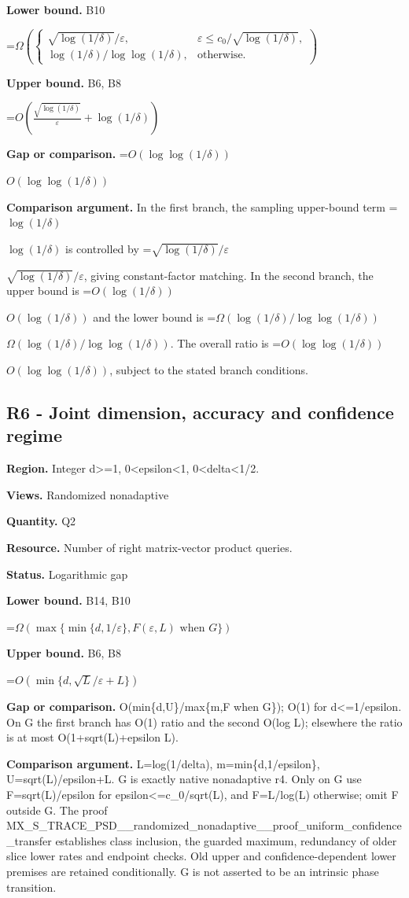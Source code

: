 \documentclass[10pt,a4paper]{article}
\newcommand{\AtlasMath}[1]{\par\begingroup\centering\setbox0=\hbox{$\displaystyle #1$}\ifdim\wd0>1.4\linewidth\typeout{ATLAS WIDE FORMULA: \the\wd0}\fi\ifdim\wd0>\linewidth\resizebox{\linewidth}{!}{\box0}\else\box0\fi\par\endgroup}
\newcommand{\AtlasInlineMath}[1]{\begingroup\setbox0=\hbox{$#1$}\ifdim\wd0>.4\linewidth\endgroup\AtlasMath{#1}\else\endgroup$#1$\fi}
\begin{document}
\textbf{Lower bound.} B10

\AtlasMath{\Omega\!\left(\begin{cases}\sqrt{\log(1/\delta)}/\varepsilon,&\varepsilon\le c_0/\sqrt{\log(1/\delta)},\\\log(1/\delta)/\log\log(1/\delta),&\text{otherwise}.\end{cases}\right)}
\textbf{Upper bound.} B6, B8

\AtlasMath{O\!\left(\frac{\sqrt{\log(1/\delta)}}{\varepsilon}+\log(1/\delta)\right)}
\textbf{Gap or comparison.} \AtlasInlineMath{O(\log\log(1/\delta))}

\textbf{Comparison argument.} In the first branch, the sampling upper-bound term \AtlasInlineMath{\log(1/\delta)} is controlled by \AtlasInlineMath{\sqrt{\log(1/\delta)}/\varepsilon}, giving constant-factor matching. In the second branch, the upper bound is \AtlasInlineMath{O(\log(1/\delta))} and the lower bound is \AtlasInlineMath{\Omega(\log(1/\delta)/\log\log(1/\delta))}. The overall ratio is \AtlasInlineMath{O(\log\log(1/\delta))}, subject to the stated branch conditions.

\subsection{R6 - Joint dimension, accuracy and confidence regime}
\textbf{Region.} Integer d>=1, 0<epsilon<1, 0<delta<1/2.

\textbf{Views.} Randomized nonadaptive

\textbf{Quantity.} Q2

\textbf{Resource.} Number of right matrix-vector product queries.

\textbf{Status.} Logarithmic gap

\textbf{Lower bound.} B14, B10

\AtlasMath{\Omega(\max\{\min\{d,1/\varepsilon\},F(\varepsilon,L)\text{ when }G\})}
\textbf{Upper bound.} B6, B8

\AtlasMath{O(\min\{d,\sqrt{L}/\varepsilon+L\})}
\textbf{Gap or comparison.} O(min\{d,U\}/max\{m,F when G\}); O(1) for d<=1/epsilon. On G the first branch has O(1) ratio and the second O(log L); elsewhere the ratio is at most O(1+sqrt(L)+epsilon L).

\textbf{Comparison argument.} L=log(1/delta), m=min\{d,1/epsilon\}, U=sqrt(L)/epsilon+L. G is exactly native nonadaptive r4. Only on G use F=sqrt(L)/epsilon for epsilon<=c\_\allowbreak{}0/sqrt(L), and F=L/log(L) otherwise; omit F outside G. The proof MX\_\allowbreak{}S\_\allowbreak{}TRACE\_\allowbreak{}PSD\_\allowbreak{}\_\allowbreak{}randomized\_\allowbreak{}nonadaptive\_\allowbreak{}\_\allowbreak{}proof\_\allowbreak{}uniform\_\allowbreak{}confidence\_\allowbreak{}transfer establishes class inclusion, the guarded maximum, redundancy of older slice lower rates and endpoint checks. Old upper and confidence-dependent lower premises are retained conditionally. G is not asserted to be an intrinsic phase transition.
\end{document}
